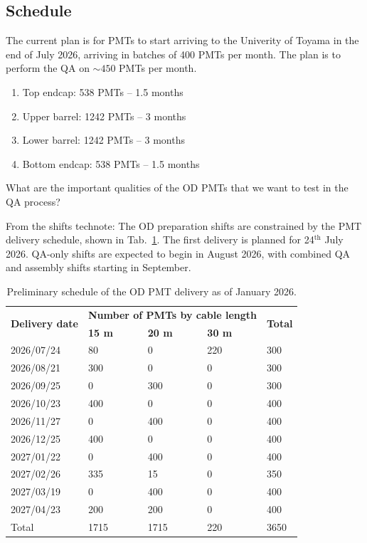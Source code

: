 \documentclass[12pt,a4paper]{article}
\begin{document}
\subsection{Schedule}

The current plan is for PMTs to start arriving to the Univerity of Toyama in the end of July 2026, arriving in batches of 400 PMTs per month. The plan is to perform the QA on $\sim 450$ PMTs per month.
\begin{enumerate}
  \item Top endcap: 538 PMTs -- 1.5 months
  \item Upper barrel: 1242 PMTs -- 3 months
  \item Lower barrel: 1242 PMTs -- 3 months
  \item Bottom endcap: 538 PMTs -- 1.5 months
\end{enumerate}

What are the important qualities of the OD PMTs that we want to test in the QA process?


From the shifts technote:
The OD preparation shifts are constrained by the PMT delivery schedule, shown in Tab.~\ref{tab:PMTDeliverySchedule}. The first delivery is planned for 24$^{\text{th}}$ July 2026. QA-only shifts are expected to begin in August 2026, with combined QA and assembly shifts starting in September.

\begin{table}
    \centering
    \caption{Preliminary schedule of the OD PMT delivery as of January 2026.}
    \label{tab:PMTDeliverySchedule}
    \begin{tabular}{|m{25mm}|m{18mm}m{18mm}m{18mm}|m{12mm}|}\hline
        \multirow{2}{25mm}{\textbf{Delivery date}} & \multicolumn{3}{|c|}{\textbf{Number of PMTs by cable length}} & \multirow{2}{*}{\textbf{Total}} \\
         & \textbf{15 m} & \textbf{20 m} & \textbf{30 m} & \\ \hline
        2026/07/24 & 80   & 0    & 220 & 300 \\
        2026/08/21 & 300  & 0    & 0   & 300 \\
        2026/09/25 & 0    & 300  & 0   & 300 \\
        2026/10/23 & 400  & 0    & 0   & 400 \\
        2026/11/27 & 0    & 400  & 0   & 400 \\
        2026/12/25 & 400  & 0    & 0   & 400 \\\hline
        2027/01/22 & 0    & 400  & 0   & 400 \\
        2027/02/26 & 335  & 15   & 0   & 350 \\
        2027/03/19 & 0    & 400  & 0   & 400 \\
        2027/04/23 & 200  & 200  & 0   & 400 \\ \hline\hline 
        Total      & 1715 & 1715 & 220 & 3650 \\\hline
    \end{tabular}
\end{table}
\end{document}
